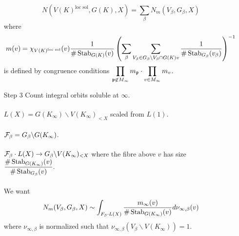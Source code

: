 \documentclass[12pt,amsfont]{amsart}
\begin{document}
\begin{itemize}
\begin{thm} \[N(V(K)^{\textrm{loc sol}}, G(K), X) = \displaystyle \sum_{\beta} N_m(V_\beta, G_\beta, X)\]
where
\[m(v) = \chi_{V(K)^{\textrm{loc sol}}}(v) \frac{1}{\#\operatorname{Stab}_{G(K)}(v)} \left(\sum_\beta \sum_{V_\beta \in G_\beta \setminus V_\beta \cap G(K)v} \frac{1}{\#\operatorname{Stab}_{G_\beta} (v_\beta)}\right)^{-1} \]
is defined by congruence conditions $\displaystyle \prod_{\mathfrak{p} \not \in M_\infty} m_{\mathfrak{p}} \cdot \prod_{v \in M_\infty} m_v$. 

\end{thm}

\item[Step 3]
Count integral orbits soluble at $\infty$. \\ \\
$L(X) = G(K_\infty) \backslash V(K_\infty)_{< X}$ scaled from $L(1)$. \\ \\
$\mathcal{F}_\beta = G_\beta \backslash G(K_\infty)$. \\ \\
$\mathcal{F}_\beta \cdot L(X) \rightarrow G_\beta \backslash V(K_\infty)_{< X}$ where the fibre above $v$ has size $\displaystyle \frac{\# \operatorname{Stab}_{G(K_\infty)}(v)}{\# \operatorname{Stab}_{G_\beta}(v)}.$ \\ \\
We want
\[N_m(V_\beta, G_\beta, X) \sim \int_{F_\beta \cdot L(X)} \frac{m_\infty(v)}{\# \operatorname{Stab}_{G(K_\infty)} (v)} d \nu_{\infty, \beta}(v)\]
where $\nu_{\infty, \beta}$ is normalized such that $\nu_{\infty, \beta}(V_\beta \backslash V(K_\infty)) = 1.$ 


\end{itemize}
\end{document}
